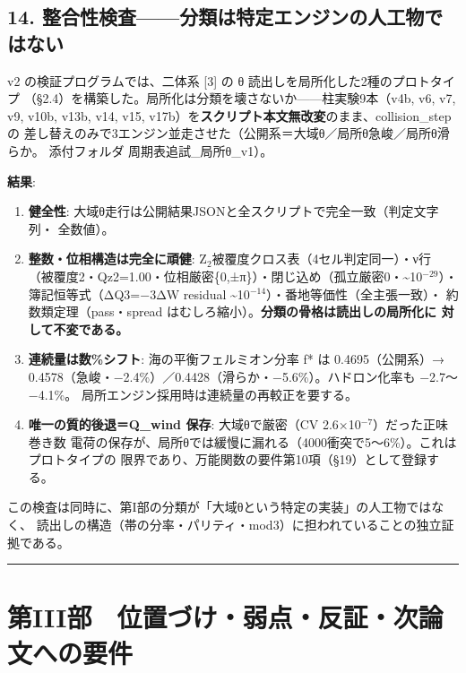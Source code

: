 \documentclass[
]{ltjarticle}
\providecommand{\tightlist}{%
  \setlength{\itemsep}{0pt}\setlength{\parskip}{0pt}}
\begin{document}
\subsection{14.
整合性検査------分類は特定エンジンの人工物ではない}\label{ux6574ux5408ux6027ux691cux67fbux5206ux985eux306fux7279ux5b9aux30a8ux30f3ux30b8ux30f3ux306eux4ebaux5de5ux7269ux3067ux306fux306aux3044}

v2 の検証プログラムでは、二体系 {[}3{]} の θ
読出しを局所化した2種のプロトタイプ
（§2.4）を構築した。局所化は分類を壊さないか------柱実験9本（v4b, v6,
v7, v9, v10b, v13b, v14, v15,
v17b）を\textbf{スクリプト本文無改変}のまま、collision\_step の
差し替えのみで3エンジン並走させた（公開系＝大域θ／局所θ急峻／局所θ滑らか。
添付フォルダ 周期表追試\_局所θ\_v1）。

\textbf{結果}:

\begin{enumerate}
\def\labelenumi{\arabic{enumi}.}
\tightlist
\item
  \textbf{健全性}:
  大域θ走行は公開結果JSONと全スクリプトで完全一致（判定文字列・
  全数値）。
\item
  \textbf{整数・位相構造は完全に頑健}:
  Z\(_{2}\)被覆度クロス表（4セル判定同一）・ν行
  （被覆度2・Qz2=1.00・位相厳密\{0,±π\}）・閉じ込め（孤立厳密0・\textasciitilde10\(^{-29}\)）・
  簿記恒等式（ΔQ3=−3ΔW residual
  \textasciitilde10\(^{-14}\)）・番地等価性（全主張一致）・
  約数類定理（pass・spread
  はむしろ縮小）。\textbf{分類の骨格は読出しの局所化に
  対して不変である。}
\item
  \textbf{連続量は数\%シフト}: 海の平衡フェルミオン分率 f* は
  0.4695（公開系）→
  0.4578（急峻・−2.4\%）／0.4428（滑らか・−5.6\%）。ハドロン化率も
  −2.7〜−4.1\%。 局所エンジン採用時は連続量の再較正を要する。
\item
  \textbf{唯一の質的後退＝Q\_wind 保存}: 大域θで厳密（CV
  2.6×10\(^{-7}\)）だった正味巻き数
  電荷の保存が、局所θでは緩慢に漏れる（4000衝突で5〜6\%）。これはプロトタイプの
  限界であり、万能関数の要件第10項（§19）として登録する。
\end{enumerate}

この検査は同時に、第I部の分類が「大域θという特定の実装」の人工物ではなく、
読出しの構造（帯の分率・パリティ・mod3）に担われていることの独立証拠である。

\begin{center}\rule{0.5\linewidth}{0.5pt}\end{center}

\section{第III部　位置づけ・弱点・反証・次論文への要件}\label{ux7b2ciiiux90e8-ux4f4dux7f6eux3065ux3051ux5f31ux70b9ux53cdux8a3cux6b21ux8ad6ux6587ux3078ux306eux8981ux4ef6}
\end{document}
